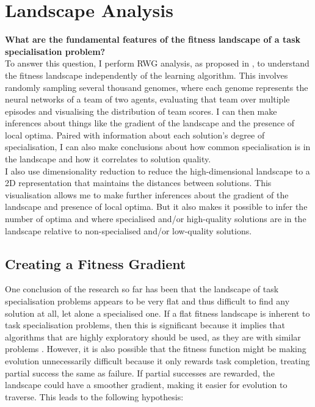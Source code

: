 \documentclass[12pt]{article}
\begin{document}
\section{Landscape Analysis}\label{landscape_analysis}

\textbf{What are the fundamental features of the fitness landscape of a task specialisation problem?}\\

To answer this question, I perform RWG analysis, as proposed in \cite{oller:AAMAS:2020}, to understand the fitness landscape independently of the learning algorithm.
This involves randomly sampling several thousand genomes, where each genome represents the neural networks of a team of two agents, evaluating that team over multiple episodes and visualising the distribution of team scores. 
I can then make inferences about things like the gradient of the landscape and the presence of local optima.
Paired with information about each solution's degree of specialisation, I can also make conclusions about how common specialisation is in the landscape and how it correlates to solution quality.\\

I also use dimensionality reduction to reduce the high-dimensional landscape to a 2D representation that maintains the distances between solutions.
This visualisation allows me to make further inferences about the gradient of the landscape and presence of local optima.
But it also makes it possible to infer the number of optima and where specialised and/or high-quality solutions are in the landscape relative to non-specialised and/or low-quality solutions.\\

\subsection{Creating a Fitness Gradient}

One conclusion of the research so far has been that the landscape of task specialisation problems appears to be very flat and thus difficult to find any solution at all, let alone a specialised one.
If a flat fitness landscape is inherent to task specialisation problems, then this is significant because it implies that algorithms that are highly exploratory should be used, as they are with similar problems \cite{oller:AAMAS:2020}.
However, it is also possible that the fitness function might be making evolution unnecessarily difficult because it only rewards task completion, treating partial success the same as failure.
If partial successes are rewarded, the landscape could have a smoother gradient, making it easier for evolution to traverse.
This leads to the following hypothesis:\\
\end{document}

